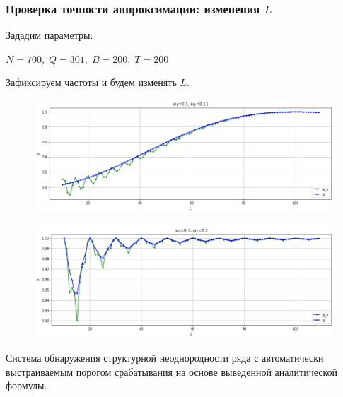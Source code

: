 \documentclass[11pt]{beamer}
\begin{document}
	\begin{frame}
		\frametitle{Проверка точности аппроксимации: изменения $ L $}
		Зададим параметры:
		
		$ N = 700,\; Q = 301,\; B = 200,\; T = 200 $
		
		Зафиксируем частоты и будем изменять $ L $.
		
		\begin{figure}[b]
			\centering
			\includegraphics[width=0.6\linewidth]{imgs/dynamics_L}
		\end{figure}
		
		\begin{figure}[b]
			\centering
			\includegraphics[width=0.6\linewidth]{imgs/dynamics_L_1}
		\end{figure}
		
	\end{frame}
	
	\begin{frame}
		\centering
		Система обнаружения структурной неоднородности ряда с автоматически выстраиваемым порогом срабатывания на основе выведенной аналитической формулы.
	\end{frame}
	
\end{document}

